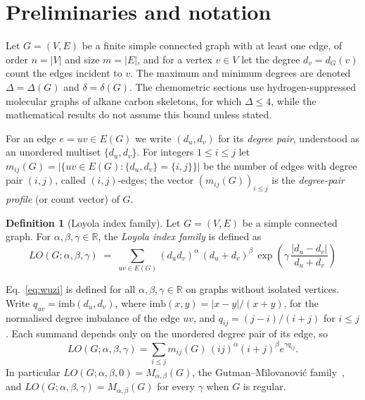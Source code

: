 \documentclass[a5paper, 10pt]{article}
\theoremstyle{plain}
\theoremstyle{remark}
\theoremstyle{definition}
\newtheorem{definition}{Definition}
\newcommand{\Wuzi}{LO(G;\alpha,\beta,\gamma)}
\begin{document}
\section{Preliminaries and notation}\label{sec:prelim}\label{sec:notation}\label{sec:def}

Let $G = (V, E)$ be a finite simple connected graph with at least one edge, of order
$n = |V|$ and size $m = |E|$, and for a vertex $v \in V$ let the degree
$d_v = d_G(v)$ count the edges incident to $v$. The maximum and
minimum degrees are denoted $\Delta = \Delta(G)$ and
$\delta = \delta(G)$. The chemometric sections use hydrogen-suppressed
molecular graphs of alkane carbon skeletons, for which $\Delta \le 4$,
while the mathematical results do not assume this bound unless stated.

For an edge $e = uv \in E(G)$ we write $(d_u, d_v)$ for its
\emph{degree pair}, understood as an unordered multiset
$\{d_u, d_v\}$. For integers $1 \le i \le j$ let
$m_{ij}(G) = |\{uv \in E(G) : \{d_u, d_v\} = \{i, j\}\}|$ be the number
of edges with degree pair $(i,j)$, called $(i,j)$-edges; the vector
$(m_{ij}(G))_{i \le j}$ is the \emph{degree-pair profile} (or count
vector) of $G$.

\begin{definition}[Loyola index family]\label{def:wuzi}
Let $G = (V, E)$ be a simple connected graph. For
$\alpha, \beta, \gamma \in \mathbb{R}$, the \emph{Loyola index family}
is defined as
\begin{equation}\label{eq:wuzi}
\Wuzi
\;=\; \sum_{uv \in E(G)}
(d_u d_v)^{\alpha}\,(d_u + d_v)^{\beta}\,
\exp\!\left(\gamma\,\frac{|d_u - d_v|}{d_u + d_v}\right)
\end{equation}
\end{definition}

Eq.~\eqref{eq:wuzi} is defined for all $\alpha, \beta, \gamma \in \mathbb{R}$
on graphs without isolated vertices. Write
$q_{uv} = \mathrm{imb}(d_u, d_v)$, where $\mathrm{imb}(x,y) = |x - y|/(x + y)$,
for the normalised degree imbalance of the edge $uv$, and $q_{ij} = (j - i)/(i + j)$ for $i \le j$. Each
summand depends only on the unordered degree pair of its edge, so
\begin{equation}\label{eq:pairsum}
LO(G;\alpha,\beta,\gamma) = \sum_{i \le j} m_{ij}(G)\,
(ij)^{\alpha}(i+j)^{\beta} e^{\gamma q_{ij}} .
\end{equation}
In particular $LO(G;\alpha,\beta,0) = M_{\alpha,\beta}(G)$, the
Gutman--Milovanovi\'c family~\cite{GutmanMilovanovic2020AKCE, MolinaSigarreta2025GM},
and $LO(G;\alpha,\beta,\gamma) = M_{\alpha,\beta}(G)$ for every
$\gamma$ when $G$ is regular.
\end{document}
